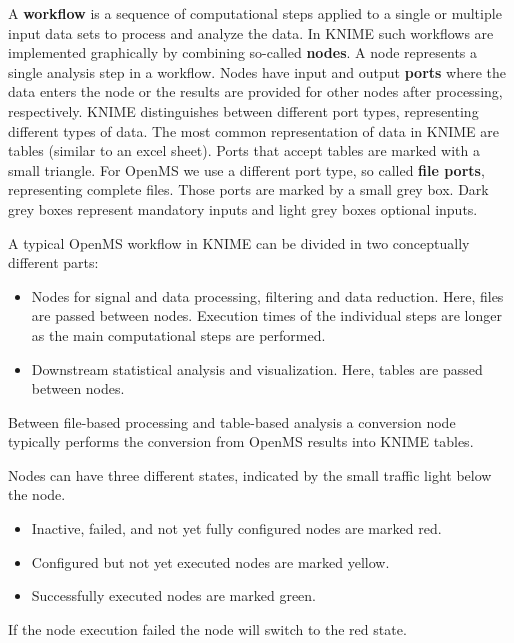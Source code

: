 A \textbf{workflow} is a sequence of computational steps applied to a single or multiple input data sets to process and analyze the data.
In KNIME such workflows are implemented graphically by combining so-called \textbf{nodes}.
A node represents a single analysis step in a workflow.
Nodes have input and output \textbf{ports} where the data enters the node or the results are provided for other nodes after processing, respectively.
KNIME distinguishes between different port types, representing different types of data.
The most common representation of data in KNIME are tables (similar to an excel sheet).
Ports that accept tables are marked with a small triangle.
For OpenMS we use a different port type, so called \textbf{file ports}, representing complete files.
Those ports are marked by a small grey box.
Dark grey boxes represent mandatory inputs and light grey boxes optional inputs.

A typical OpenMS workflow in KNIME can be divided in two conceptually different parts:
\begin{itemize}
\item
Nodes for signal and data processing, filtering and data reduction. Here, files are passed between nodes. Execution times of the individual steps are longer as the main computational steps are performed. 
\item
Downstream statistical analysis and visualization. Here, tables are passed between nodes.
\end{itemize}

Between file-based processing and table-based analysis a conversion node typically performs the conversion from OpenMS results into KNIME tables.

Nodes can have three different states, indicated by the small traffic light below the node.

\begin{itemize}
\item
Inactive, failed, and not yet fully configured nodes are marked red.
\item
Configured but not yet executed nodes are marked yellow.
\item
Successfully executed nodes are marked green.
\end{itemize}

If the node execution failed the node will switch to the red state.

